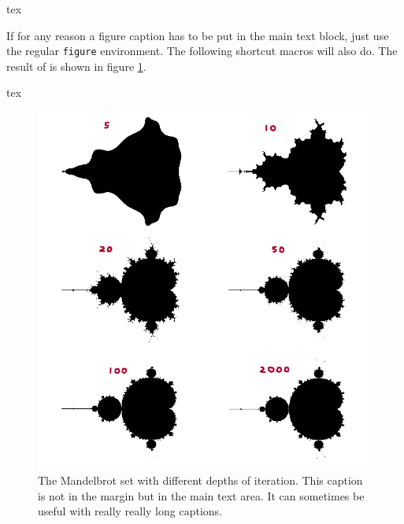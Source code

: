 \begin{codebox}{tex}
\end{codebox}



If for any reason a figure caption has to be put in the main text block, just use the regular \texttt{figure} environment. The following shortcut macros will also do. The result of  is shown in figure \ref{fig:figure-plain}.

\begin{codebox}{tex}
\end{codebox}


\begin{figure}[htb!]
    \includegraphics[width =.7\linewidth]{figures/mandelbrot.png}
    \caption[The Mandelbrot set with different depths of iteration. This caption is not in the margin but in the main text area. It can sometimes be useful with really really long captions.]{The Mandelbrot set with different depths of iteration. This caption is not in the margin but in the main text area. It can sometimes be useful with really really long captions. \lipsum[1]\label{fig:figure-plain}}

\end{figure}

